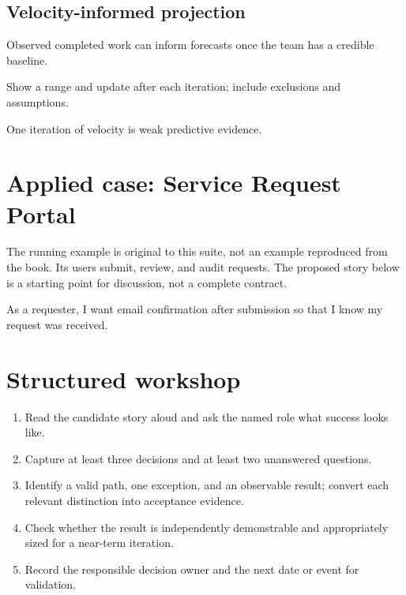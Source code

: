 \documentclass[11pt,letterpaper]{article}
\begin{document}
\subsection{Velocity-informed projection}
Observed completed work can inform forecasts once the team has a credible baseline.

\begin{tcolorbox}[colback=tealback,colframe=navy,title={Engineering translation},breakable]
Show a range and update after each iteration; include exclusions and assumptions.

\end{tcolorbox}
\begin{tcolorbox}[colback=amberback,colframe=navy,title={Failure mode to watch},breakable]
One iteration of velocity is weak predictive evidence.

\end{tcolorbox}
\section{Applied case: Service Request Portal}
The running example is original to this suite, not an example reproduced from the book. Its users submit, review, and audit requests. The proposed story below is a starting point for discussion, not a complete contract.

\begin{tcolorbox}[colback=blueback,colframe=navy,title={Candidate story},breakable]
As a requester, I want email confirmation after submission so that I know my request was received.

\end{tcolorbox}
\section{Structured workshop}
\begin{enumerate}[leftmargin=*,itemsep=3pt]
\item Read the candidate story aloud and ask the named role what success looks like.
\item Capture at least three decisions and at least two unanswered questions.
\item Identify a valid path, one exception, and an observable result; convert each relevant distinction into acceptance evidence.
\item Check whether the result is independently demonstrable and appropriately sized for a near-term iteration.
\item Record the responsible decision owner and the next date or event for validation.
\end{enumerate}
\end{document}
